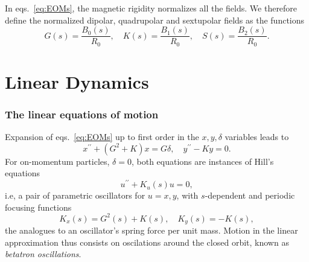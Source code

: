 In eqs.~\eqref{eq:EOMs}, the magnetic rigidity normalizes all the fields. We therefore define the normalized dipolar, quadrupolar and sextupolar fields as the functions
\begin{equation}
    G(s) = \frac{B_0(s)}{R_0}, \quad K(s) = \frac{B_1(s)}{R_0}, \quad S(s) = \frac{B_2(s)}{R_0}.
    \label{eq:mag_funcs}
\end{equation}

\section{Linear Dynamics}
\subsubsection{The linear equations of motion}
Expansion of eqs.~\eqref{eq:EOMs} up to first order in the $x, y, \delta$ variables leads to \cite{sands_physics_1969}
    \begin{equation}
        x^{\prime\prime}+(G^2+K)x=G\delta, \quad
        y^{\prime\prime}-Ky=0.
        \label{eq:linearEOM}
    \end{equation}
    For on-momentum particles, $\delta=0$, both equations are instances of Hill's equations
    \begin{equation}
        u^{\prime\prime}+K_u(s)u = 0,
        \label{eq:Hill}
    \end{equation}
   i.e, a pair of parametric oscillators for $u=x,y$, with $s$-dependent and periodic focusing functions
         $$K_x(s) = G^2(s) + K(s), \quad K_y(s) = - K(s),$$
    the analogues to an oscillator's spring force per unit mass. Motion in the linear approximation thus consists on oscilations around the closed orbit, known as \textit{betatron oscillations}.

